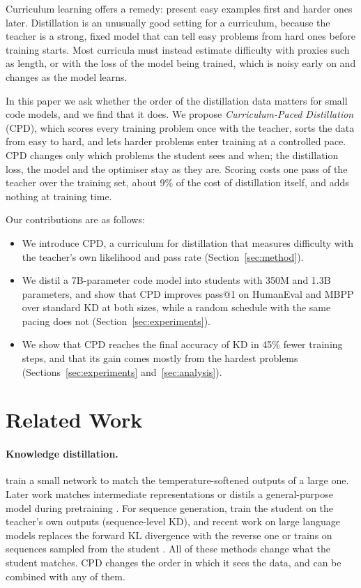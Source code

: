 \documentclass{article} %
\begin{document}
Curriculum learning \citep{bengio2009curriculum} offers a remedy: present easy examples first and harder ones later.
Distillation is an unusually good setting for a curriculum, because the teacher is a strong, fixed model that can tell easy problems from hard ones before training starts.
Most curricula must instead estimate difficulty with proxies such as length, or with the loss of the model being trained, which is noisy early on and changes as the model learns.

In this paper we ask whether the order of the distillation data matters for small code models, and we find that it does.
We propose \emph{Curriculum-Paced Distillation} (CPD), which scores every training problem once with the teacher, sorts the data from easy to hard, and lets harder problems enter training at a controlled pace.
CPD changes only which problems the student sees and when; the distillation loss, the model and the optimiser stay as they are.
Scoring costs one pass of the teacher over the training set, about 9\% of the cost of distillation itself, and adds nothing at training time.

Our contributions are as follows:
\begin{itemize}
\item We introduce CPD, a curriculum for distillation that measures difficulty with the teacher's own likelihood and pass rate (Section~\ref{sec:method}).
\item We distil a 7B-parameter code model into students with 350M and 1.3B parameters, and show that CPD improves pass@1 on HumanEval and MBPP over standard KD at both sizes, while a random schedule with the same pacing does not (Section~\ref{sec:experiments}).
\item We show that CPD reaches the final accuracy of KD in 45\% fewer training steps, and that its gain comes mostly from the hardest problems (Sections~\ref{sec:experiments} and~\ref{sec:analysis}).
\end{itemize}

\section{Related Work}
\label{sec:related}

\paragraph{Knowledge distillation.}
\citet{hinton2015distilling} train a small network to match the temperature-softened outputs of a large one.
Later work matches intermediate representations \citep{romero2015fitnets} or distils a general-purpose model during pretraining \citep{sanh2019distilbert}.
For sequence generation, \citet{kim2016sequence} train the student on the teacher's own outputs (sequence-level KD), and recent work on large language models replaces the forward KL divergence with the reverse one \citep{gu2024minillm} or trains on sequences sampled from the student \citep{agarwal2024onpolicy}.
All of these methods change what the student matches.
CPD changes the order in which it sees the data, and can be combined with any of them.
\end{document}
